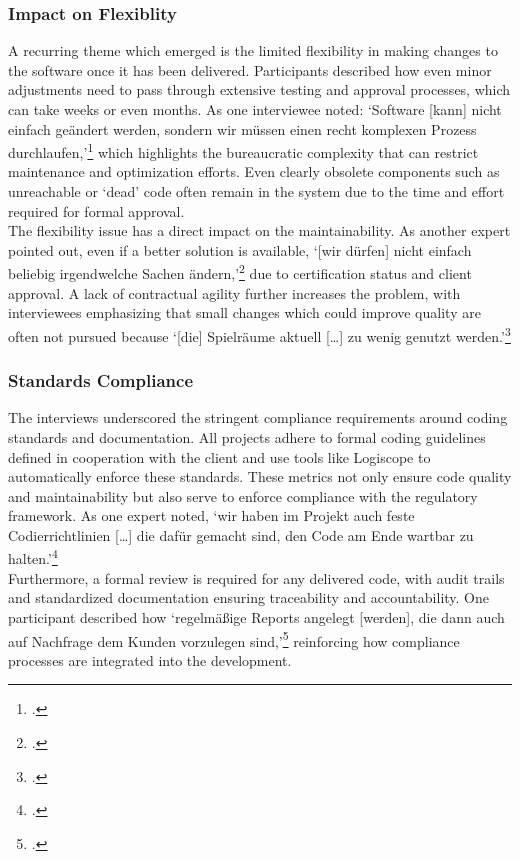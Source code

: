 \subsubsection{Impact on Flexiblity}
A recurring theme which emerged is the limited flexibility in making changes to the software once it has been delivered. Participants described how even minor adjustments need to pass through extensive testing and approval processes, which can take weeks or even months.
As one interviewee noted: `Software [kann] nicht einfach geändert werden, sondern wir müssen einen recht komplexen Prozess durchlaufen,'\footcite{Interview22025} which highlights the bureaucratic complexity that can restrict maintenance and optimization efforts. Even clearly obsolete components such as unreachable or `dead' code
often remain in the system due to the time and effort required for formal approval.\\

The flexibility issue has a direct impact on the maintainability. As another expert pointed out, even if a better solution is available, `[wir dürfen] nicht einfach beliebig irgendwelche Sachen ändern,'\footcite{Interview32025} due to certification status and client approval. A lack of contractual agility further increases the problem,
with interviewees emphasizing that small changes which could improve quality are often not pursued because `[die] Spielräume aktuell [\ldots] zu wenig genutzt werden.'\footcite{Interview32025}

\subsubsection{Standards Compliance}
The interviews underscored the stringent compliance requirements around coding standards and documentation. All projects adhere to formal coding guidelines defined in cooperation with the client and use tools like Logiscope to automatically enforce these standards.
These metrics not only ensure code quality and maintainability but also serve to enforce compliance with the regulatory framework. As one expert noted, `wir haben im Projekt auch feste Codierrichtlinien [\ldots] die dafür gemacht sind, den Code am Ende wartbar zu halten.'\footcite{Interview22025}\\
Furthermore, a formal review is required for any delivered code, with audit trails and standardized documentation ensuring traceability and accountability. One participant described how `regelmäßige Reports angelegt [werden], die dann auch auf Nachfrage dem Kunden vorzulegen sind,'\footcite{Interview22025} reinforcing how compliance processes are integrated into the development.

